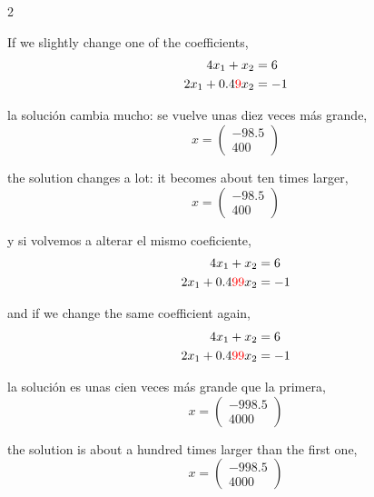 \begin{paracol}{2}
\switchcolumn

If we slightly change one of the coefficients,
\begin{align*}
4x_1+x_2&=6\\
2x_1+0.4{\color{red}9} x_2&=-1
\end{align*}

\switchcolumn

la solución cambia mucho: se vuelve unas diez veces más grande,
\begin{equation*}
x=\begin{pmatrix}
-98.5\\
400
\end{pmatrix}
\end{equation*}

\switchcolumn

the solution changes a lot: it becomes about ten times larger,
\begin{equation*}
x=\begin{pmatrix}
-98.5\\
400
\end{pmatrix}
\end{equation*}

\switchcolumn
y si volvemos a alterar el mismo coeficiente,
\begin{align*}
4x_1+x_2&=6\\
2x_1+0.4{\color{red}99} x_2&=-1
\end{align*}

\switchcolumn

and if we change the same coefficient again,
\begin{align*}
4x_1+x_2&=6\\
2x_1+0.4{\color{red}99} x_2&=-1
\end{align*}

\switchcolumn

la solución es unas cien veces más grande que la primera,
\begin{equation*}
x=\begin{pmatrix}
-998.5\\
4000
\end{pmatrix}
\end{equation*}

\switchcolumn

the solution is about a hundred times larger than the first one,
\begin{equation*}
x=\begin{pmatrix}
-998.5\\
4000
\end{pmatrix}
\end{equation*}


\end{paracol}
